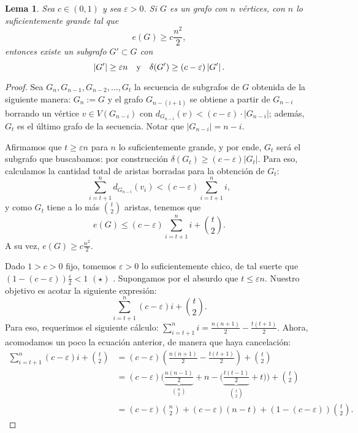 \documentclass[12pt]{report}
\theoremstyle{plain}
\newtheorem{lemma}[theorem]{Lema}
\theoremstyle{definition}
\newcommand{\abs}[1]{\left \vert #1 \right \vert}
\begin{document}
\begin{lemma}\label{lema:erdos-stone lema 1}
Sea $c \in (0,1)$ y sea $\varepsilon > 0$. Si $G$ es un grafo con $n$ vértices, con $n$ lo suficientemente grande tal que
\[
    e(G) \geq c \frac{n^2}{2},
\]
entonces existe un subgrafo $G' \subset G$ con
\[
    \abs{G'} \geq \varepsilon n \quad \text y \quad \delta (G') \geq (c- \varepsilon) \abs{G'}.
\]
\end{lemma}
\begin{proof}
Sea $G_n, G_{n-1}, G_{n-2}, \ldots, G_t$ la secuencia de subgrafos de $G$ obtenida de la siguiente manera: $G_n := G$ y el grafo $G_{n - (i+1)}$ se obtiene a partir de $G_{n-i}$ borrando un vértice $v \in V(G_{n-i})$ con $d_{G_{n-i}} (v) < (c - \varepsilon) \cdot \abs{G_{n-i}}$; además, $G_t$ es el último grafo de la secuencia. Notar que $\abs{G_{n-i}} = n - i$.

Afirmamos que $t \geq \varepsilon n$ para $n$ lo suficientemente grande, y por ende, $G_t$ será el subgrafo que buscabamos: por construcción $\delta (G_t) \geq (c - \varepsilon) \abs{G_t}$. Para eso, calculamos la cantidad total de aristas borradas para la obtención de $G_t$:
\[
    \sum_{i = t + 1}^n d_{G_{n-i}} (v_i) < (c-\varepsilon) \sum_{i = t+ 1}^n i,
\]
y como $G_t$ tiene a lo más $\binom t 2$ aristas, tenemos que
\[
    e(G) \leq (c - \varepsilon) \sum_{i = t + 1}^n i + \binom t 2 .
\]
A su vez, $e(G) \geq c \frac{n^2}{2}$.

Dado $1 > c > 0$ fijo, tomemos $\varepsilon > 0$ lo suficientemente chico, de tal suerte que $(1 - (c - \varepsilon ) ) \frac{\varepsilon}{2} < 1 $ $(\star)$ . Supongamos por el absurdo que $t \leq \varepsilon n$. Nuestro objetivo es acotar la siguiente expresión:
\[
\sum_{i = t + 1}^n (c - \varepsilon) i + \binom t 2.
\]
Para eso, requerimos el siguiente cálculo: $\sum_{i = t+1}^n i = \frac{n(n+1)}{2} - \frac {t(t+1)}2$. Ahora, acomodamos un poco la ecuación anterior, de manera que haya cancelación:
\begin{align*}
\sum_{i = t + 1}^n (c - \varepsilon) i + \binom t 2 &= (c - \varepsilon) \left ( \frac{n(n+1)}{2} - \frac{t(t+1)}{2} \right ) + \binom t 2 \\
                                        &= (c - \varepsilon) \Bigg ( \underbrace{\frac{n(n-1)}{2}}_{\binom n 2} + n - \Big (\underbrace{\frac{t(t-1)}{2}}_{\binom t 2} + t \Big ) \Bigg ) + \binom t 2 \\
                                        &= (c - \varepsilon) \binom n 2 + (c - \varepsilon)(n - t) + (1 - (c - \varepsilon)) \binom t 2.
\end{align*}





\end{proof}
\end{document}
